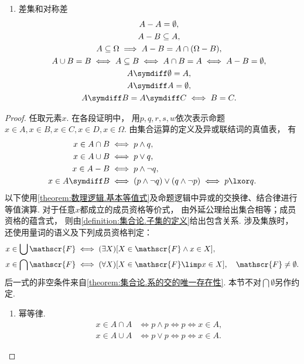 \begin{property}
\begin{enumerate}
\item 差集和对称差
\begin{gather}
	A - A = \emptyset, \\
	A - B \subseteq A, \\
	A \subseteq \Omega
	\implies
	A - B = A \cap (\Omega - B), \\
	A \cup B = B
		\iff A \subseteq B
		\iff A \cap B = A
		\iff A - B = \emptyset, \label{equation:集合论.集合代数公式7-3} \\
	A \symdiff \emptyset = A, \\
	A \symdiff A = \emptyset, \\
	A \symdiff B = A \symdiff C
		\iff B = C.
\end{gather}
\end{enumerate}
    \begin{proof}
        任取元素\(x\).
        在各段证明中，
        用\(p,q,r,s,w\)依次表示命题\(x\in A,x\in B,x\in C,x\in D,x\in\Omega\).
        由集合运算的定义及异或联结词的真值表，
        有
        \begin{align*}
            x\in A\cap B &\iff p\land q, \\
            x\in A\cup B &\iff p\lor q, \\
            x\in A-B &\iff p\land\neg q, \\
            x\in A\symdiff B &\iff (p\land\neg q)\lor(q\land\neg p)
            \iff p\lxor q.
        \end{align*}
        以下使用\cref{theorem:数理逻辑.基本等值式}及命题逻辑中异或的交换律、结合律进行等值演算.
        对于任意\(x\)都成立的成员资格等价式，
        由外延公理给出集合相等；成员资格的蕴含式，
        则由\cref{definition:集合论.子集的定义}给出包含关系.
        涉及集族时，
        还使用量词的语义及下列成员资格判定：
        \begin{align*}
            x\in\bigcup\mathscr{F}
            &\iff (\exists X)[X\in\mathscr{F}\land x\in X], \\
            x\in\bigcap\mathscr{F}
            &\iff (\forall X)[X\in\mathscr{F}\limp x\in X],
            \quad\mathscr{F}\neq\emptyset.
        \end{align*}
        后一式的非空条件来自\cref{theorem:集合论.系的交的唯一存在性}.
        本节不对\(\bigcap\emptyset\)另作约定.
        \begin{enumerate}
            \item 幂等律.
            \begin{align*}
                x\in A\cap A
                &\iff p\land p\iff p\iff x\in A, \tag{合取幂等律}\\
                x\in A\cup A
                &\iff p\lor p\iff p\iff x\in A. \tag{析取幂等律}
            \end{align*}


\end{enumerate}
\end{proof}
\end{property}
